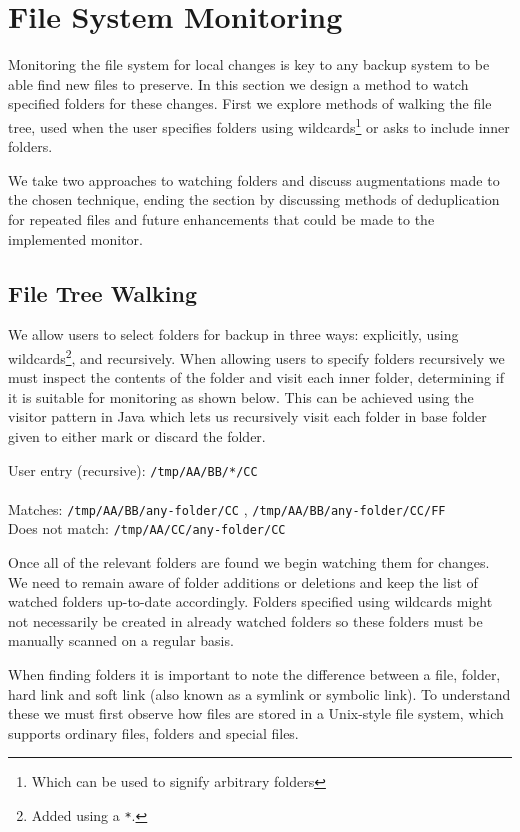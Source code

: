 \documentclass[11pt, a4paper, twoside]{report}
\def\code#1{\texttt{#1}}
\begin{document}
\section{File System Monitoring}

Monitoring the file system for local changes is key to any backup system to be able find new files to preserve. In this section we design a method to watch specified folders for these changes. First we explore methods of walking the file tree, used when the user specifies folders using wildcards\footnote{Which can be used to signify arbitrary folders} or asks to include inner folders.

We take two approaches to watching folders and discuss augmentations made to the chosen technique, ending the section by discussing methods of deduplication for repeated files and future enhancements that could be made to the implemented monitor.

\subsection{File Tree Walking}

We allow users to select folders for backup in three ways: explicitly, using wildcards\footnote{Added using a \code{*}.}, and recursively. When allowing users to specify folders recursively we must inspect the contents of the folder and visit each inner folder, determining if it is suitable for monitoring as shown below. This can be achieved using the visitor pattern in Java which lets us recursively visit each folder in base folder given to either mark or discard the folder. \citep{sugrue2010visitor}

\begin{displayquote}
 User entry (recursive): \code{/tmp/AA/BB/*/CC} \\ \\
 Matches: \code{/tmp/AA/BB/any-folder/CC} , \code{/tmp/AA/BB/any-folder/CC/FF}\\
 Does not match: \code{/tmp/AA/CC/any-folder/CC}
\end{displayquote}

Once all of the relevant folders are found we begin watching them for changes. We need to remain aware of folder additions or deletions and keep the list of watched folders up-to-date accordingly. Folders specified using wildcards might not necessarily be created in already watched folders so these folders must be manually scanned on a regular basis.

When finding folders it is important to note the difference between a file, folder, hard link and soft link (also known as a symlink or symbolic link). To understand these we must first observe how files are stored in a Unix-style file system, which supports ordinary files, folders and special files.
\end{document}
